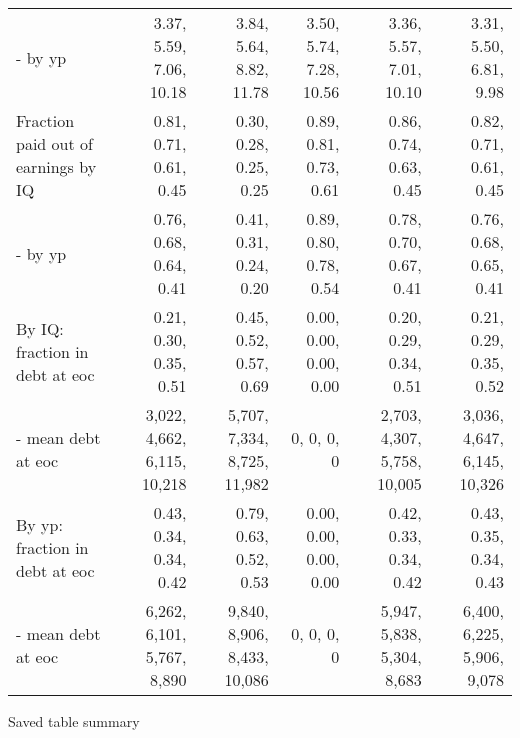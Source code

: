 \begin{tabular}{lrrrrr}
- by yp & 3.37, 5.59, 7.06, 10.18  & 3.84, 5.64, 8.82, 11.78  & 3.50, 5.74, 7.28, 10.56  & 3.36, 5.57, 7.01, 10.10  & 3.31, 5.50, 6.81, 9.98  \\
Fraction paid out of earnings by IQ & 0.81, 0.71, 0.61, 0.45  & 0.30, 0.28, 0.25, 0.25  & 0.89, 0.81, 0.73, 0.61  & 0.86, 0.74, 0.63, 0.45  & 0.82, 0.71, 0.61, 0.45  \\
- by yp & 0.76, 0.68, 0.64, 0.41  & 0.41, 0.31, 0.24, 0.20  & 0.89, 0.80, 0.78, 0.54  & 0.78, 0.70, 0.67, 0.41  & 0.76, 0.68, 0.65, 0.41  \\
By IQ: fraction in debt at eoc & 0.21, 0.30, 0.35, 0.51  & 0.45, 0.52, 0.57, 0.69  & 0.00, 0.00, 0.00, 0.00  & 0.20, 0.29, 0.34, 0.51  & 0.21, 0.29, 0.35, 0.52  \\
- mean debt at eoc & 3,022, 4,662, 6,115, 10,218  & 5,707, 7,334, 8,725, 11,982  & 0, 0, 0, 0  & 2,703, 4,307, 5,758, 10,005  & 3,036, 4,647, 6,145, 10,326  \\
By yp: fraction in debt at eoc & 0.43, 0.34, 0.34, 0.42  & 0.79, 0.63, 0.52, 0.53  & 0.00, 0.00, 0.00, 0.00  & 0.42, 0.33, 0.34, 0.42  & 0.43, 0.35, 0.34, 0.43  \\
- mean debt at eoc & 6,262, 6,101, 5,767, 8,890  & 9,840, 8,906, 8,433, 10,086  & 0, 0, 0, 0  & 5,947, 5,838, 5,304, 8,683  & 6,400, 6,225, 5,906, 9,078  \\
\hline
\end{tabular}%
Saved table summary

